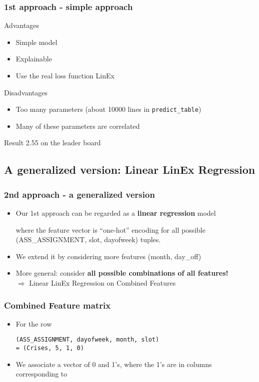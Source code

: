 \documentclass{beamer}
\begin{document}
\begin{frame}\frametitle{1st approach - simple approach}
\begin{block}{Advantages}
\begin{itemize}
\item
Simple model
\item
Explainable
\item
Use the real loss function LinEx
\end{itemize}
\end{block}
\begin{alertblock}{Disadvantages}
\begin{itemize}
\item
Too many parameters (about 10000 lines in \texttt{predict\_table})
\item
Many of these parameters are correlated
\end{itemize}
\end{alertblock}

\begin{exampleblock}{Result}
2.55 on the leader board
\end{exampleblock}
\end{frame}


\subsection{A generalized version: Linear LinEx Regression}

\begin{frame} \frametitle{2nd approach - a generalized version}
\begin{itemize}
\item
Our 1st approach can be regarded as a \textbf{linear regression} model \\
\begin{small}
where the feature vector is “one-hot” encoding for all possible
(ASS\_ASSIGNMENT, slot, dayofweek) tuples.
\end{small}
\item
We extend it by considering more features (month, day\_off)
\item
More general: consider \textbf{all possible combinations of all
features!} \\
\pause
$\Rightarrow$ Linear LinEx Regression on Combined Features
\end{itemize}
\end{frame}


\begin{frame}[fragile] \frametitle{Combined Feature matrix}
\begin{itemize}
\item
For the row 
\begin{verbatim}
(ASS_ASSIGNMENT, dayofweek, month, slot) 
= (Crises, 5, 1, 0)
\end{verbatim}
\item
We associate a vector of 0 and 1’s, where the 1’s are in columns corresponding to
\end{itemize}
\end{frame}
\end{document}
